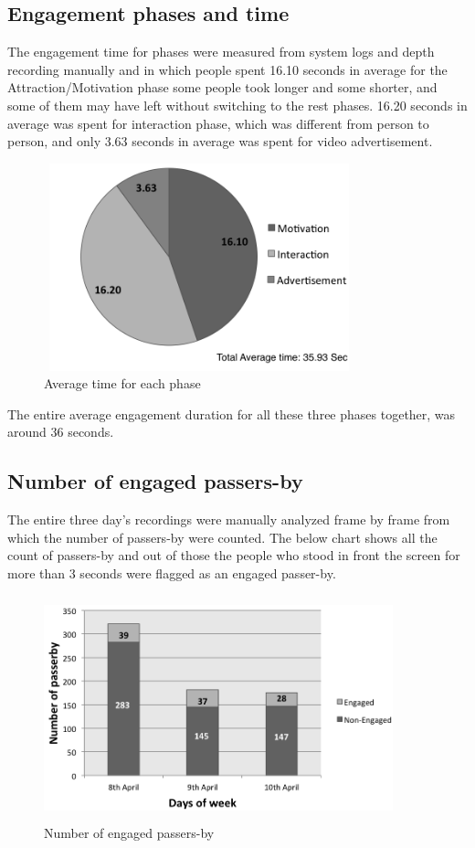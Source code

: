 \subsection{Engagement phases and time}
The engagement time for phases were measured from system logs and depth recording manually and in which people spent 16.10 seconds in average for the Attraction/Motivation phase some people took longer and some shorter, and some of them may have left without switching to the rest phases. 16.20 seconds in average was spent for interaction phase, which was different from person to person, and only 3.63 seconds in average was spent for video advertisement.

\begin{figure}[H]
    \centering
    \includegraphics[width=90mm,height=60mm]{Figures/9/avg_phases}
    \caption{Average time for each phase}%
    \label{fig:newbodyaveragephases}%
\end{figure}

The entire average engagement duration for all these three phases together, was around 36 seconds.

\subsection{Number of engaged passers-by}
The entire three day’s recordings were manually analyzed frame by frame from which the number of passers-by were counted. The below chart shows all the count of passers-by and out of those the people who stood in front the screen for more than 3 seconds were flagged as an engaged passer-by. 

\begin{figure}[H]
    \centering
    \includegraphics[width=0.9\textwidth,height=6.5cm]{Figures/9/newbody_inter_engage_day}
    \caption{Number of engaged passers-by}%
    \label{fig:newbodyengagedandengagedby}%
\end{figure}


